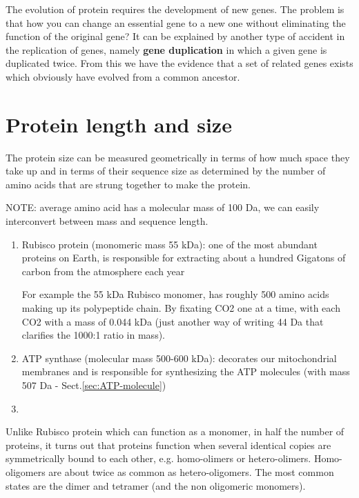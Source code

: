 The evolution of protein requires the development of new genes. The
problem is that how you can change an essential gene to a new one
without eliminating the function of the original gene? It can be
explained by another type of accident in the replication of genes,
namely {\bf gene duplication} in which a given gene is duplicated
twice. From this we have the evidence that a set of related genes
exists which obviously have evolved from a common ancestor.



\section{Protein length and size}
\label{sec:protein-length}
\label{sec:protein-size}

The protein size can be measured geometrically in terms of how much space they
take up and in terms of their sequence size as determined by the number of amino
acids that are strung together to make the protein.

NOTE: average amino acid has a molecular mass of 100 Da, we can easily
interconvert between mass and sequence length.

\begin{enumerate}
  
  \item Rubisco protein (monomeric mass 55 kDa):  one of the most abundant
  proteins on Earth, is responsible for extracting about a hundred Gigatons of
  carbon from the atmosphere each year

  For example the 55 kDa Rubisco monomer, has roughly 500 amino acids making up
  its polypeptide chain. By fixating CO2 one at a time, with each CO2 with a
  mass of 0.044 kDa (just another way of writing 44 Da that clarifies the 1000:1
  ratio in mass).
  
  
  \item ATP synthase (molecular mass 500-600 kDa): decorates our mitochondrial
  membranes and is responsible for synthesizing the ATP molecules (with mass
  507 Da - Sect.\ref{sec:ATP-molecule})
  
  \item 
\end{enumerate}
Unlike Rubisco protein which can function as a monomer, 
in half the number of proteins, it turns out that proteins function when several
identical copies are symmetrically bound to each other, e.g. homo-olimers or
hetero-olimers. Homo-oligomers are about twice as common as hetero-oligomers.
The most common states are the dimer and tetramer (and the non
oligomeric monomers). 

